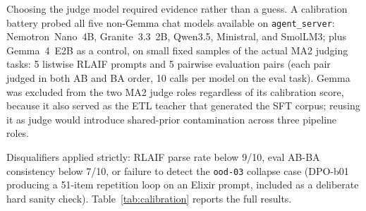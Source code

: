 \documentclass[../main.tex]{subfiles}
\begin{document}
Choosing the judge model required evidence rather than a guess. A calibration battery probed all five non-Gemma chat models available on \texttt{agent\_server}: Nemotron~Nano~4B, Granite~3.3~2B, Qwen3.5, Ministral, and SmolLM3; plus Gemma~4~E2B as a control, on small fixed samples of the actual MA2 judging tasks: 5 listwise RLAIF prompts and 5 pairwise evaluation pairs (each pair judged in both AB and BA order, 10 calls per model on the eval task). Gemma was excluded from the two MA2 judge roles regardless of its calibration score, because it also served as the ETL teacher that generated the SFT corpus; reusing it as judge would introduce shared-prior contamination across three pipeline roles.

Disqualifiers applied strictly: RLAIF parse rate below 9/10, eval AB-BA consistency below 7/10, or failure to detect the \texttt{ood-03} collapse case (DPO-b01 producing a 51-item repetition loop on an Elixir prompt, included as a deliberate hard sanity check). Table~\ref{tab:calibration} reports the full results.

\begin{table}[h]
\centering
\small
{}
\caption{Cross-judge calibration battery results. Bold entries are the passing scores on each metric. \texttt{nemotron} is assigned the RLAIF role; \texttt{granite-3.3} is assigned the eval role.}
\label{tab:calibration}
\end{table}
\end{document}
